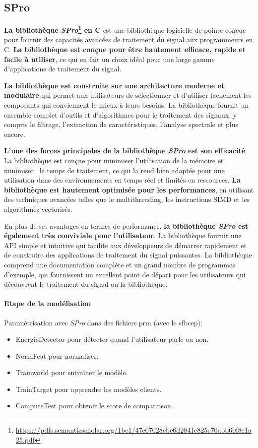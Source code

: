 \subsection{SPro}
\label{subsec:SPro}

\textbf{La bibliothèque \textit{SPro}\footnote{\url{https://pdfs.semanticscholar.org/1bc1/47e07028cbe6d2841e825c70abb60f8e1a25.pdf}} en C} est une bibliothèque logicielle de pointe conçue pour fournir des capacités avancées de traitement du signal
aux programmeurs en C. \textbf{La bibliothèque est conçue pour être hautement efficace, rapide et facile à utiliser}, ce qui en fait un choix idéal
pour une large gamme d'applications de traitement du signal.

\textbf{La bibliothèque est construite sur une architecture moderne et modulaire} qui permet aux utilisateurs de sélectionner et d'utiliser facilement
les composants qui conviennent le mieux à leurs besoins. La bibliothèque fournit un ensemble complet d'outils et d'algorithmes pour le traitement des signaux,
y compris le filtrage, l'extraction de caractéristiques, l'analyse spectrale et plus encore.

\textbf{L'une des forces principales de la bibliothèque \textit{SPro} est son efficacité}. La bibliothèque est conçue pour minimiser l'utilisation de la mémoire et minimiser \
le temps de traitement, ce qui la rend bien adaptée pour une utilisation dans des environnements en temps réel et limités en ressources. \textbf{La bibliothèque est hautement optimisée pour
    les performances}, en utilisant des techniques avancées telles que le multithreading, les instructions SIMD et les algorithmes vectorisés.

En plus de ses avantages en termes de performance, \textbf{la bibliothèque \textit{SPro} est également très conviviale pour l'utilisateur}. La bibliothèque fournit une API simple
et intuitive qui facilite aux développeurs de démarrer rapidement et de construire des applications de traitement du signal puissantes. La bibliothèque comprend une documentation
complète et un grand nombre de programmes d'exemple, qui fournissent un excellent point de départ pour les utilisateurs qui découvrent le traitement du signal ou la bibliothèque.\\
\paragraph*{Etape de la modélisation}

Paramétrisation avec \textit{SPro} dans des fichiers prm (avec le sfbcep):
\begin{itemize}
    \item EnergieDetector pour détecter quand l'utilisateur parle ou non.
    \item NormFeat pour normaliser.
    \item Trainworld pour entraîner le modèle.
    \item TrainTarget pour apprendre les modèles clients.
    \item ComputeTest pour obtenir le score de comparaison.
\end{itemize}

